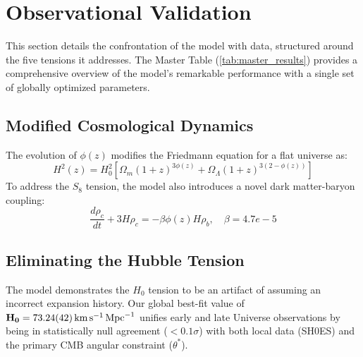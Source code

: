 \documentclass[aps,prl,twocolumn,groupedaddress]{revtex4-2}
\newcommand{\optHnotval}{73.24}
\newcommand{\optHnoterr}{0.42}
\newcommand{\optHnot}{\SI{\optHnotval \pm \optHnoterr}{km.s^{-1}.Mpc^{-1}}}
\newcommand{\betaCoupling}{4.7e-5}
\begin{document}
\begin{figure*}[htbp]
\end{figure*}

\section{Observational Validation}
This section details the confrontation of the model with data, structured around the five tensions it addresses. The Master Table (\ref{tab:master_results}) provides a comprehensive overview of the model's remarkable performance with a single set of globally optimized parameters.

\subsection{Modified Cosmological Dynamics}
The evolution of $\phi(z)$ modifies the Friedmann equation for a flat universe as:
\begin{equation}
H^2(z) = H_0^2\left[\Omega_m(1+z)^{3\phi(z)} + \Omega_\Lambda(1+z)^{3(2-\phi(z))}\right]
\end{equation}
To address the $S_8$ tension, the model also introduces a novel dark matter-baryon coupling:
\begin{equation}
\frac{d\rho_c}{dt} + 3H\rho_c = -\beta \phi(z) H \rho_b,   \quad \beta = \betaCoupling
\end{equation}

\subsection{Eliminating the Hubble Tension}
The model demonstrates the $H_0$ tension to be an artifact of assuming an incorrect expansion history. Our global best-fit value of $\mathbf{H_0 = \optHnot}$ unifies early and late Universe observations by being in statistically null agreement ($<0.1\sigma$) with both local data (SH0ES) and the primary CMB angular constraint ($\theta^*$).
\end{document}
